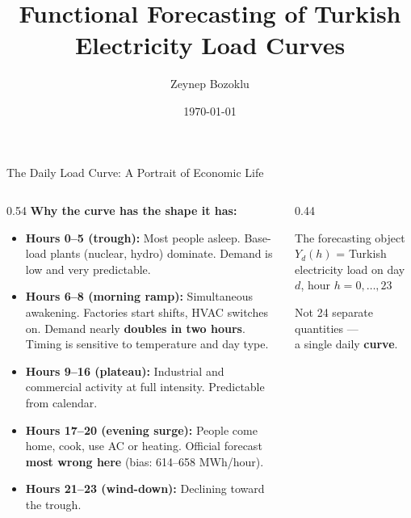 \documentclass[10pt,aspectratio=169]{beamer}
\title[Functional Load Forecasting]{Functional Forecasting of Turkish Electricity Load Curves}
\author{Zeynep Bozoklu}
\institute{Thesis Proposal}
\date{\today}
\begin{document}
\begin{frame}
  \titlepage
\end{frame}


\begin{frame}{The Daily Load Curve: A Portrait of Economic Life}

  \begin{columns}
  \begin{column}{0.54\textwidth}
    \textbf{Why the curve has the shape it has:}
    \vspace{0.3em}
    \begin{itemize}
      \item \textcolor{accentblue}{\textbf{Hours 0--5 (trough):}} Most people asleep.
        Base-load plants (nuclear, hydro) dominate.
        Demand is low and very predictable.
      \item \textcolor{accentred}{\textbf{Hours 6--8 (morning ramp):}} Simultaneous
        awakening. Factories start shifts, HVAC switches on.
        Demand nearly \textbf{doubles in two hours}.
        Timing is sensitive to temperature and day type.
      \item \textbf{Hours 9--16 (plateau):} Industrial and commercial
        activity at full intensity. Predictable from calendar.
      \item \textcolor{accentred}{\textbf{Hours 17--20 (evening surge):}}
        People come home, cook, use AC or heating. Official forecast
        \textbf{most wrong here} (bias: 614--658 MWh/hour).
      \item \textbf{Hours 21--23 (wind-down):} Declining toward the trough.
    \end{itemize}
  \end{column}
  \begin{column}{0.44\textwidth}
    \begin{block}{The forecasting object}
      $Y_d(h)$ = Turkish electricity load on day $d$, hour $h = 0,\ldots,23$

      \vspace{0.5em}
      Not 24 separate quantities ---\\a single daily \textbf{curve}.
    \end{block}
  \end{column}
  \end{columns}
\end{frame}
\end{document}
